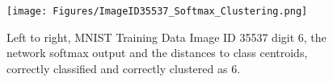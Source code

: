 
\begin{figure}[ht]
    \centering
    \texttt{[image: Figures/ImageID35537\_Softmax\_Clustering.png]}
    \caption{Left to right, MNIST Training Data Image ID 35537 digit 6, the network softmax output and the distances to class centroids, correctly classified and correctly clustered as 6.     %
    }
\label{fig:ImageID35537_Softmax_Clustering}
\end{figure}


